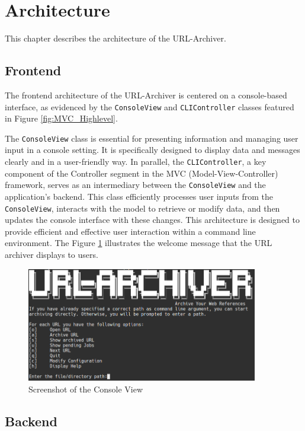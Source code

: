 \section{Architecture}
This chapter describes the architecture of the URL-Archiver. 

\subsection{Frontend}
The frontend architecture of the URL-Archiver is centered on a console-based interface, as evidenced by the \texttt{ConsoleView} and \texttt{CLIController} classes featured in Figure \ref{fig:MVC_Highlevel}.

The \texttt{ConsoleView} class is essential for presenting information and managing user input in a console setting. It is specifically designed to display data and messages clearly and in a user-friendly way. In parallel, the \texttt{CLIController}, a key component of the Controller segment in the MVC (Model-View-Controller)  framework, serves as an intermediary between the \texttt{ConsoleView} and the application’s backend. This class efficiently processes user inputs from the \texttt{ConsoleView}, interacts with the model to retrieve or modify data, and then updates the console interface with these changes. This architecture is designed to provide efficient and effective user interaction within a command line environment. The Figure \ref{fig:Screenshot_ConsoleView} illustrates the welcome message that the URL archiver displays to users.
\begin{figure}[h!]
    \center
    \includegraphics[width=0.9\textwidth]{pictures/final_presentation/command_line_application.jpg}
    \caption{Screenshot of the Console View}
    \label{fig:Screenshot_ConsoleView}
\end{figure}


\subsection{Backend}

